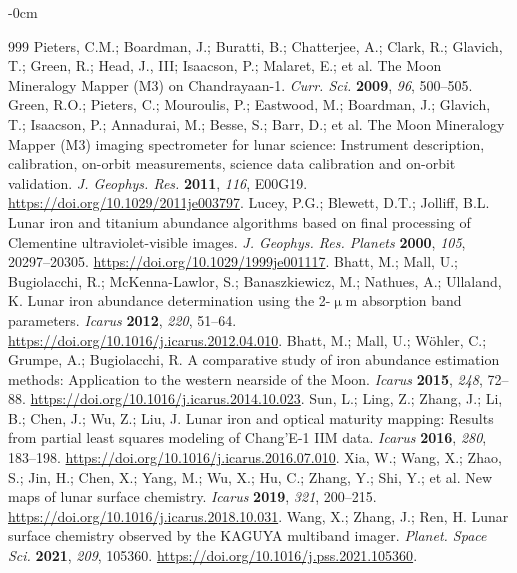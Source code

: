 \documentclass[remotesensing,article,submit,pdftex,moreauthors]{Definitions/mdpi}
\begin{document}
\begin{adjustwidth}{-\extralength}{0cm}
\begin{thebibliography}{999}
Pieters, C.M.; Boardman, J.; Buratti, B.; Chatterjee, A.; Clark, R.; Glavich, T.; Green, R.; Head, J., III; Isaacson, P.; Malaret, E.; et al. The Moon Mineralogy Mapper (M3) on Chandrayaan-1. \emph{Curr. Sci.} {\bf 2009}, \emph{96}, 500--505.
Green, R.O.; Pieters, C.; Mouroulis, P.; Eastwood, M.; Boardman, J.; Glavich, T.; Isaacson, P.; Annadurai, M.; Besse, S.; Barr, D.; et al. The Moon Mineralogy Mapper (M3) imaging spectrometer for lunar science: Instrument description, calibration, on-orbit measurements, science data calibration and on-orbit validation. \emph{J. Geophys. Res.} {\bf 2011}, \emph{116}, E00G19. \url{https://doi.org/10.1029/2011je003797}.
Lucey, P.G.; Blewett, D.T.; Jolliff, B.L. Lunar iron and titanium abundance algorithms based on final processing of Clementine ultraviolet-visible images. \emph{J. Geophys. Res. Planets} {\bf 2000}, \emph{105}, 20297--20305. \url{https://doi.org/10.1029/1999je001117}.
Bhatt, M.; Mall, U.; Bugiolacchi, R.; McKenna-Lawlor, S.; Banaszkiewicz, M.; Nathues, A.; Ullaland, K. Lunar iron abundance determination using the 2-$\upmu$m absorption band parameters. \emph{Icarus} {\bf 2012}, \emph{220}, 51--64. \url{https://doi.org/10.1016/j.icarus.2012.04.010}.
Bhatt, M.; Mall, U.; Wöhler, C.; Grumpe, A.; Bugiolacchi, R. A comparative study of iron abundance estimation methods: Application to the western nearside of the Moon. \emph{Icarus} {\bf 2015}, \emph{248}, 72--88. \url{https://doi.org/10.1016/j.icarus.2014.10.023}.
Sun, L.; Ling, Z.; Zhang, J.; Li, B.; Chen, J.; Wu, Z.; Liu, J. Lunar iron and optical maturity mapping: Results from partial least squares modeling of Chang'E-1 IIM data. \emph{Icarus} {\bf 2016}, \emph{280}, 183--198. \url{https://doi.org/10.1016/j.icarus.2016.07.010}.
Xia, W.; Wang, X.; Zhao, S.; Jin, H.; Chen, X.; Yang, M.; Wu, X.; Hu, C.; Zhang, Y.; Shi, Y.; et al. New maps of lunar surface chemistry. \emph{Icarus} {\bf 2019}, \emph{321}, 200--215. \url{https://doi.org/10.1016/j.icarus.2018.10.031}.
Wang, X.; Zhang, J.; Ren, H. Lunar surface chemistry observed by the KAGUYA multiband imager. \emph{Planet. Space Sci.} {\bf 2021}, \emph{209}, 105360. \url{https://doi.org/10.1016/j.pss.2021.105360}.

\end{thebibliography}
\end{adjustwidth}
\end{document}
